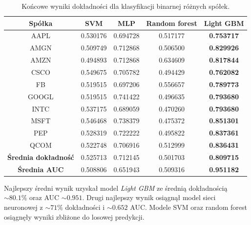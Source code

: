 \documentclass[a4paper, twoside, 11pt, openright]{article}
\begin{document}
 \begin{table}[H]
    \centering
    \begin{tabular}{|c|c|c|c|c|}
    \hline
        \textbf{Spółka} & \textbf{SVM} &  \textbf{MLP}  &  \textbf{Random forest}  &  \textbf{Light GBM} \\ \hline
AAPL   &  0.530176 & 0.694728  & 0.517177 & \textbf{0.753717}\\ \hline
AMGN   &  0.509749 &  0.712868 & 0.506500 &  \textbf{0.829926} \\ \hline
AMZN   &  0.494893 & 0.712868 & 0.634609 & \textbf{0.817844} \\ \hline
CSCO   &  0.549675 &  0.705782 & 0.494429 &  \textbf{0.762082} \\ \hline
FB     &  0.519515 & 0.697206 & 0.556657 & \textbf{0.789773} \\ \hline
GOOGL  &  0.519515 &  0.741422 & 0.496635 & \textbf{0.793680} \\ \hline
INTC   &  0.537175 & 0.689059  & 0.470260 & \textbf{0.793680} \\ \hline
MSFT   &  0.546468 & 0.738379 & 0.475372 &  \textbf{0.851301}\\ \hline
PEP    &  0.528319 & 0.722222  & 0.495822 & \textbf{0.837361} \\ \hline
QCOM   &  0.522748 &  0.706916 & 0.512999 & \textbf{0.836431} \\ \hline \hline
\textbf{Średnia dokładność} &  0.525713 & 0.712145 & 0.501703 & \textbf{0.809715} \\  \hline  
\textbf{Średnia AUC} &  0.508806 & 0.651943 & 0.509316 & \textbf{0.951182} \\  \hline
    \end{tabular}
    \caption{Końcowe wyniki dokładności dla klasyfikacji binarnej różnych spółek.}
    \label{tab:comparison_final_binary}
\end{table}   

Najlepszy średni wynik uzyskał model \textit{Light GBM} ze średnią dokładnością $\sim 80.1\%$ oraz AUC $\sim 0.951$. Drugi najlepszy wynik osiągnął model sieci neuronowej z $\sim 71\%$ dokładności i $\sim 0.652$ AUC. Modele SVM oraz random forest osiągnęły wyniki zbliżone do losowej predykcji.
\end{document}
